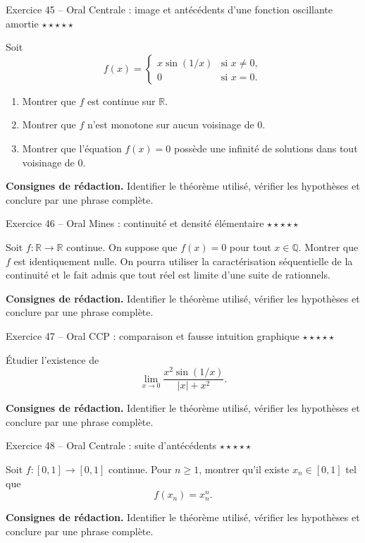 \documentclass[11pt,a4paper]{article}
\newcommand{\etoiles}[1]{\hfill\textcolor{orangeprepa}{\textbf{#1}}}
\newcommand{\R}{\mathbb{R}}
\begin{document}
\begin{exobox}{Exercice 45 -- Oral Centrale : image et antécédents d'une fonction oscillante amortie \etoiles{$\star\star\star\star\star$}}

Soit
\[
f(x)=\begin{cases}
x\sin(1/x)&\text{si }x\neq0,\\
0&\text{si }x=0.
\end{cases}
\]
\begin{enumerate}
\item Montrer que $f$ est continue sur $\R$.
\item Montrer que $f$ n'est monotone sur aucun voisinage de $0$.
\item Montrer que l'équation $f(x)=0$ possède une infinité de solutions dans tout voisinage de $0$.
\end{enumerate}

\medskip
\textbf{Consignes de rédaction.} Identifier le théorème utilisé, vérifier les hypothèses et conclure par une phrase complète.
\end{exobox}


\begin{exobox}{Exercice 46 -- Oral Mines : continuité et densité élémentaire \etoiles{$\star\star\star\star\star$}}

Soit $f:\R\to\R$ continue. On suppose que $f(x)=0$ pour tout $x\in\mathbb Q$. Montrer que $f$ est identiquement nulle. On pourra utiliser la caractérisation séquentielle de la continuité et le fait admis que tout réel est limite d'une suite de rationnels.

\medskip
\textbf{Consignes de rédaction.} Identifier le théorème utilisé, vérifier les hypothèses et conclure par une phrase complète.
\end{exobox}


\begin{exobox}{Exercice 47 -- Oral CCP : comparaison et fausse intuition graphique \etoiles{$\star\star\star\star\star$}}

Étudier l'existence de
\[
\lim_{x\to0}\frac{x^2\sin(1/x)}{|x|+x^2}.
\]

\medskip
\textbf{Consignes de rédaction.} Identifier le théorème utilisé, vérifier les hypothèses et conclure par une phrase complète.
\end{exobox}


\begin{exobox}{Exercice 48 -- Oral Centrale : suite d'antécédents \etoiles{$\star\star\star\star\star$}}

Soit $f:[0,1]\to[0,1]$ continue. Pour $n\geq1$, montrer qu'il existe $x_n\in[0,1]$ tel que
\[
f(x_n)=x_n^n.
\]

\medskip
\textbf{Consignes de rédaction.} Identifier le théorème utilisé, vérifier les hypothèses et conclure par une phrase complète.
\end{exobox}
\end{document}
